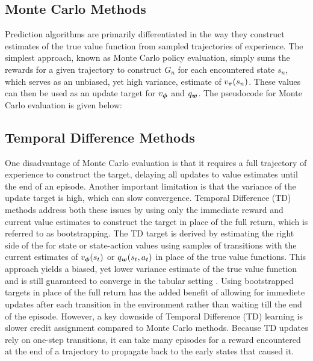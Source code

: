 \subsection{Monte Carlo Methods}
Prediction algorithms are primarily differentiated in the way they construct estimates of the true value function from sampled trajectories of experience. The simplest approach, known as Monte Carlo policy evaluation, simply sums the rewards for a given trajectory to construct $G_n$ for each encountered state $s_n$, which serves as an unbiased, yet high variance, estimate of $v_{\pi}(s_n)$. These values can then be used as an update target for $v_{\bm \phi}$ and $q_{\bm w}$. The pseudocode for Monte Carlo evaluation is given below: %

\subsection{Temporal Difference Methods}
One disadvantage of Monte Carlo evaluation is that it requires a full trajectory of experience to construct the target, delaying all updates to value estimates until the end of an episode. Another important limitation is that the variance of the update target is high, which can slow convergence. Temporal Difference (TD) methods address both these issues by using only the immediate reward and current value estimates to construct the target in place of the full return, which is referred to as bootstrapping. The TD target is derived by estimating the right side of the  for state or state-action values using samples of transitions with the current estimates of $v_{\bm \phi}(s_t)$ or $q_{\bm w}(s_t, a_t)$ in place of the true value functions. 
This approach yields a biased, yet lower variance  estimate of the true value function and is still guaranteed to converge in the tabular setting . Using bootstrapped targets in place of the full return has the added benefit of allowing for immediete updates after each transition in the environment rather than waiting till the end of the episode. However, a key downside of Temporal Difference (TD) learning is slower credit assignment compared to Monte Carlo methods. Because TD updates rely on one-step transitions, it can take many episodes for a reward encountered at the end of a trajectory to propagate back to the early states that caused it.

